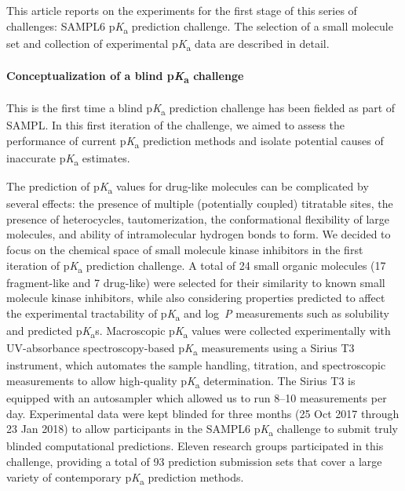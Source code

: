 \documentclass[9pt,lineno]{elife}
\newcommand{\pKa}{p\textit{K}\textsubscript{a}}
\newcommand{\logD}{log~\textit{D}}
\newcommand{\logP}{log~\textit{P}}
\begin{document}
This article reports on the experiments for the first stage of this series of challenges: SAMPL6 \pKa{} prediction challenge. 
The selection of a small molecule set and collection of experimental \pKa{} data are described in detail.

\paragraph{Conceptualization of a blind \pKa{} challenge}

This is the first time a blind \pKa{} prediction challenge has been fielded as part of SAMPL. 
In this first iteration of the challenge, we aimed to assess the performance of current \pKa{} prediction methods and isolate potential causes of inaccurate \pKa{} estimates.

The prediction of \pKa{} values for drug-like molecules can be complicated by several effects: the presence of multiple (potentially coupled) titratable sites, the presence of heterocycles, tautomerization, the conformational flexibility of large molecules, and ability of intramolecular hydrogen bonds to form. 
We decided to focus on the chemical space of small molecule kinase inhibitors in the first iteration of \pKa{} prediction challenge. 
A total of 24 small organic molecules (17 fragment-like and 7 drug-like) were selected for their similarity to known small molecule kinase inhibitors, while also considering properties predicted to affect the experimental tractability of \pKa{} and \logP{} measurements such as solubility and predicted \pKa{}s. 
Macroscopic \pKa{} values were collected experimentally with UV-absorbance spectroscopy-based \pKa{} measurements using a Sirius T3 instrument, which automates the sample handling, titration, and spectroscopic measurements to allow high-quality \pKa{} determination. 
The Sirius T3 is equipped with an autosampler which allowed us to run 8--10 measurements per day.
Experimental data were kept blinded for three months (25 Oct 2017 through 23 Jan 2018) to allow participants in the SAMPL6 \pKa{} challenge to submit truly blinded computational predictions. 
Eleven research groups participated in this challenge, providing a total of 93 prediction submission sets that cover a large variety of contemporary \pKa{} prediction methods. 
 
\end{document}
